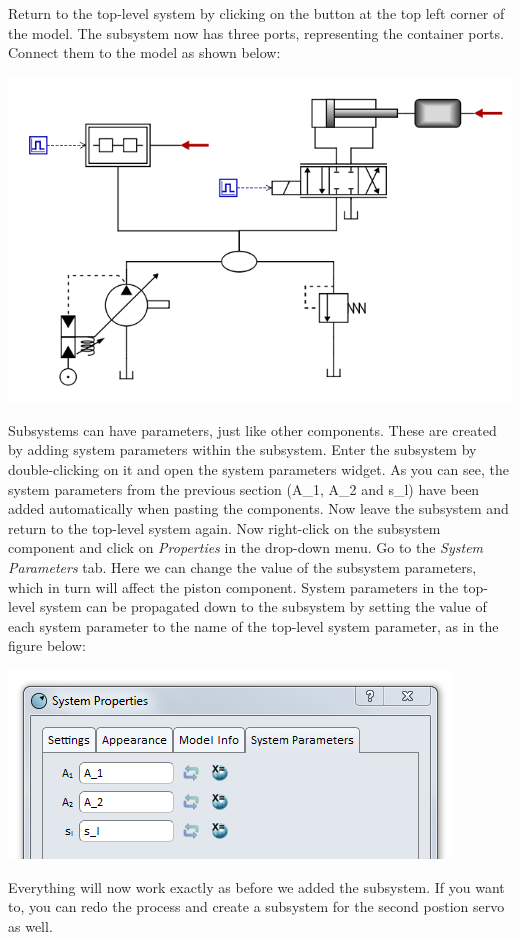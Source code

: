\documentclass[a4paper,pdftex]{article}
\begin{document}
\begin{tutenumerate}
Return to the top-level system by clicking on the button at the top left corner of the model. The subsystem now has three ports, representing the container ports. Connect them to the model as shown below:

\includegraphics[width=0.85\linewidth]{gfx/advancedusage/connectedsubsystem.png}

Subsystems can have parameters, just like other components. These are created by adding system parameters within the subsystem. Enter the subsystem by double-clicking on it and open the system parameters widget. As you can see, the system parameters from the previous section (A\_1, A\_2 and s\_l) have been added automatically when pasting the components. Now leave the subsystem and return to the top-level system again. Now right-click on the subsystem component and click on \textit{Properties} in the drop-down menu. Go to the \textit{System Parameters} tab. Here we can change the value of the subsystem parameters, which in turn will affect the piston component. System parameters in the top-level system can be propagated down to the subsystem by setting the value of each system parameter to the name of the top-level system parameter, as in the figure below:

\includegraphics[width=0.6\linewidth]{gfx/advancedusage/subsystemparameters.png}

Everything will now work exactly as before we added the subsystem. If you want to, you can redo the process and create a subsystem for the second postion servo as well.

\end{tutenumerate}
\end{document}
